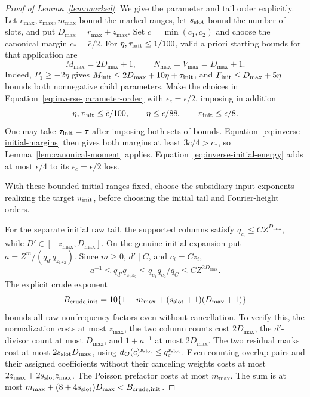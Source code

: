 \documentclass[11pt,a4paper]{article}
\numberwithin{equation}{section}
\numberwithin{figure}{section}
\theoremstyle{definition}
\theoremstyle{remark}
\begin{document}
\begin{proof}[Proof of Lemma~\ref{lem:marked}]
We give the parameter and tail order explicitly.  Let
\(r_{\max},z_{\max},m_{\max}\) bound the marked ranges, let
\(s_{\rm slot}\) bound the number of slots, and put
\(D_{\max}=r_{\max}+z_{\max}\).  Set
\(\bar c=\min(c_1,c_2)\) and choose the canonical margin
\(c_*=\bar c/2\).  For \(\eta,\tau_{\rm init}\le1/100\), valid a priori
starting bounds for that application are
\[
 M_{\max}=2D_{\max}+1,\qquad N_{\max}=V_{\max}=D_{\max}+1.
\]
Indeed, \(P_1\ge-2\eta\) gives
\(M_{\rm init}\le2D_{\max}+10\eta+\tau_{\rm init}\), and
\(F_{\rm init}\le D_{\max}+5\eta\) bounds both nonnegative child
parameters.  Make the choices in Equation~\eqref{eq:inverse-parameter-order}
with \(\epsilon_c=\epsilon/2\), imposing in addition
\[
 \eta,\tau_{\rm init}\le\bar c/100,\qquad
 \eta\le\epsilon/88,\qquad \pi_{\rm init}\le\epsilon/8.
\]
One may take \(\tau_{\rm init}=\tau\) after imposing both sets of bounds.
Equation~\eqref{eq:inverse-initial-margins} then gives both margins at
least \(3\bar c/4>c_*\), so Lemma~\ref{lem:canonical-moment} applies.
Equation~\eqref{eq:inverse-initial-energy} adds at most \(\epsilon/4\)
to its \(\epsilon_c=\epsilon/2\) loss.

With these bounded initial ranges fixed, choose the subsidiary input
exponents realizing the target \(\pi_{\rm init}\), before choosing the
initial tail and Fourier-height orders.

For the separate initial raw tail, the supported columns satisfy
\(q_{c_i}\le C Z^{D_{\max}}\), while \(D'\in[-z_{\max},D_{\max}]\).
On the genuine initial expansion put
\(a=Z^m/(q_{d'}q_{z_1z_2})\).  Since \(m\ge0\), \(d'\mid C\), and
\(c_i=Cz_i\),
\[
 a^{-1}\le q_{d'}q_{z_1z_2}
       \le q_{c_1}q_{c_2}/q_C\le C Z^{2D_{\max}}.
\]
The explicit crude exponent
\[
 B_{\rm crude,init}=10\{1+m_{\max}+(s_{\rm slot}+1)(D_{\max}+1)\}
\]
bounds all raw nonfrequency factors even without cancellation.  To verify
this, the normalization costs at most \(z_{\max}\), the two column counts
cost \(2D_{\max}\), the \(d'\)-divisor count at most \(D_{\max}\), and
\(1+a^{-1}\) at most \(2D_{\max}\).  The two residual marks cost at most
\(2s_{\rm slot}D_{\max}\), using \(d_{\mathcal O}(c)^{s_{\rm slot}}\le q_c^{s_{\rm slot}}\).
Even counting overlap pairs and their assigned coefficients without
their canceling weights costs at most
\(2z_{\max}+2s_{\rm slot}z_{\max}\).  The Poisson prefactor costs at most
\(m_{\max}\).  The sum is at most
\(m_{\max}+(8+4s_{\rm slot})D_{\max}<B_{\rm crude,init}\).


\end{proof}
\end{document}
